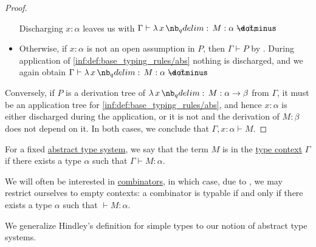 \begin{proof}
\begin{itemize}
    Discharging \( x: \alpha \) leaves us with \( \Gamma \vdash \qabs x M: \alpha \synimplies \beta \).

    \item Otherwise, if \( x: \alpha \) is not an open assumption in \( P \), then \( \Gamma \vdash P \) by . During application of \ref{inf:def:base_typing_rules/abs} nothing is discharged, and we again obtain \( \Gamma \vdash \qabs x M: \alpha \synimplies \beta \).
  \end{itemize}

  \NecessitySubProof* Conversely, if \( P \) is a derivation tree of \( \qabs x M: \alpha \to \beta \) from \( \Gamma \), it must be an application tree for \ref{inf:def:base_typing_rules/abs}, and hence \( x: \alpha \) is either discharged during the application, or it is not and the derivation of \( M: \beta \) does not depend on it. In both cases, we conclude that \( \Gamma, x: \alpha \vdash M \).
\end{proof}

\begin{definition}\label{def:typability}
  For a fixed \hyperref[def:abstract_type_system]{abstract type system}, we say that the term \( M \) is  in the \hyperref[def:type_context]{type context} \( \Gamma \) if there exists a type \( \alpha \) such that \( \Gamma \vdash M: \alpha \).
\end{definition}
\begin{comments}
  \item We will often be interested in \hyperref[def:lambda_combinator]{combinators}, in which case, due to , we may restrict ourselves to empty contexts: a combinator is typable if and only if there exists a type \( \alpha \) such that \( {}\vdash M: \alpha \).

  \item We generalize Hindley's definition for simple types to our notion of abstract type systems.
\end{comments}

